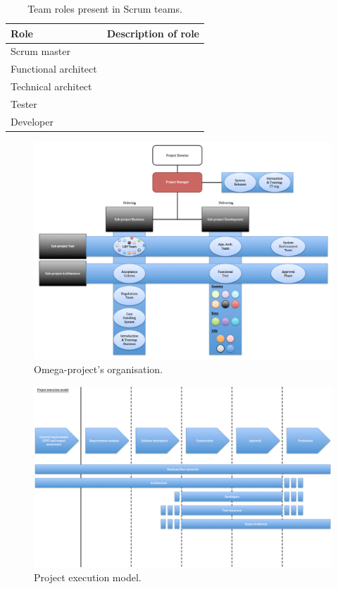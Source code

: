 \begin{table}[H]
\begin{center}
    \begin{tabular}{| p{4cm} | p{8cm} |}
    \hline
    \textbf{Role} & \textbf{Description of role} \\ \hline
    Scrum master & \\ \hline
    Functional architect & \\ \hline
    Technical architect & \\ \hline
    Tester & \\ \hline
    Developer & \\ \hline
    \end{tabular}
    \caption{Team roles present in Scrum teams.}
    \label{trpist}
\end{center}
\end{table}

\begin{figure}[H]
\centering
\includegraphics[trim = 40mm 0mm 7mm 0mm,width=180mm]{images/omega_organisation.png}
\caption{Omega-project's organisation.}
\label{omega}
\end{figure}

\begin{figure}[H]
\centering
\includegraphics[trim = 40mm 0mm 7mm 0mm,width=180mm]{images/execution_model.png}
\caption{Project execution model.}
\label{project_execution}
\end{figure}

